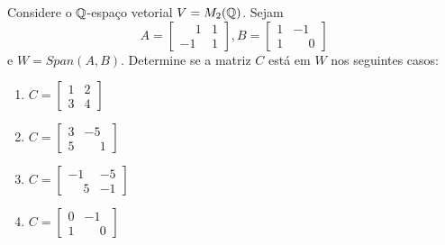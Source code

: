 \documentclass[12pt]{exam}
\begin{document}
    \questao{} Considere o $\mathbb{Q}$-espaço vetorial $V = M_2(\mathbb{Q})$. Sejam
    \[
    A = \begin{bmatrix}
        \phantom{-} 1 & 1\\
        -1 & 1
    \end{bmatrix},
    B = \begin{bmatrix}
        1 & -1\\
        1 & \phantom{-} 0
    \end{bmatrix}
    \]
    e $W = Span(A, B)$. Determine se a matriz $C$ está em $W$ nos seguintes casos:
    \begin{multicols}{2}
        \begin{enumerate}[label={\alph*})]
            \item $C = \begin{bmatrix}1 & 2\\3 & 4\end{bmatrix}$

            \item $C = \begin{bmatrix}3 & -5\\5 & \phantom{-} 1\end{bmatrix}$

            \item $C = \begin{bmatrix}-1 & -5\\ \phantom{-} 5 & -1\end{bmatrix}$

            \item $C = \begin{bmatrix}0 & -1\\1 & \phantom{-} 0\end{bmatrix}$
        \end{enumerate}
    \end{multicols}
\end{document}
